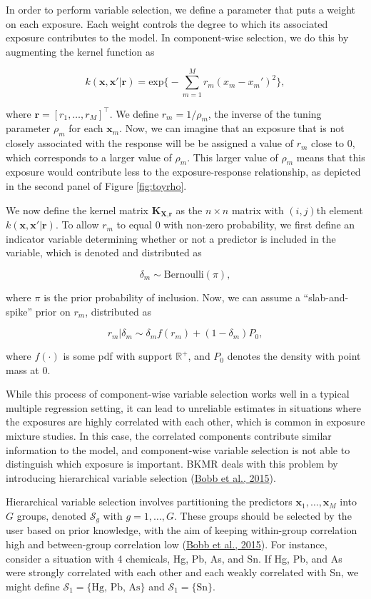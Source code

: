 \documentclass[12pt, twoside]{amherstthesis}
\begin{document}
In order to perform variable selection, we define a parameter that puts a weight on each exposure. Each weight controls the degree to which its associated exposure contributes to the model. In component-wise selection, we do this by augmenting the kernel function as

\[
k(\textbf{x}, \textbf{x}'|\textbf{r}) = \text{exp}\bigg\{ -\sum_{m=1}^Mr_m(x_m-x_m')^2 \bigg\},
\]

\noindent where \(\textbf{r}=[r_1,\dots,r_M]^\top\). We define \(r_m=1/{\rho_m}\), the inverse of the tuning parameter \(\rho_m\) for each \(\textbf{x}_m\). Now, we can imagine that an exposure that is not closely associated with the response will be be assigned a value of \(r_m\) close to 0, which corresponds to a larger value of \(\rho_m\). This larger value of \(\rho_m\) means that this exposure would contribute less to the exposure-response relationship, as depicted in the second panel of Figure \ref{fig:toyrho}.

We now define the kernel matrix \(\textbf{K}_{\textbf{X},\textbf{r}}\) as the \(n\times n\) matrix with \((i,j)\)th element \(k(\textbf{x}, \textbf{x}'|\textbf{r})\). To allow \(r_m\) to equal 0 with non-zero probability, we first define an indicator variable determining whether or not a predictor is included in the variable, which is denoted and distributed as

\[
\delta_m \sim \text{Bernoulli}(\pi),
\]

\noindent where \(\pi\) is the prior probability of inclusion. Now, we can assume a ``slab-and-spike'' prior on \(r_m\), distributed as

\[
r_m|\delta_m \sim \delta_mf(r_m) + (1-\delta_m)P_0, 
\]

\noindent where \(f(\cdot)\) is some pdf with support \(\mathbb{R}^+\), and \(P_0\) denotes the density with point mass at 0.

While this process of component-wise variable selection works well in a typical multiple regression setting, it can lead to unreliable estimates in situations where the exposures are highly correlated with each other, which is common in exposure mixture studies. In this case, the correlated components contribute similar information to the model, and component-wise variable selection is not able to distinguish which exposure is important. BKMR deals with this problem by introducing hierarchical variable selection (\protect\hyperlink{ref-bobb_bayesian_2015}{Bobb et al., 2015}).

Hierarchical variable selection involves partitioning the predictors \(\textbf{x}_1, \dots, \textbf{x}_M\) into \(G\) groups, denoted \(\mathcal{S}_g\) with \(g = 1,\dots,G\). These groups should be selected by the user based on prior knowledge, with the aim of keeping within-group correlation high and between-group correlation low (\protect\hyperlink{ref-bobb_bayesian_2015}{Bobb et al., 2015}). For instance, consider a situation with 4 chemicals, Hg, Pb, As, and Sn. If Hg, Pb, and As were strongly correlated with each other and each weakly correlated with Sn, we might define \(\mathcal{S}_1=\{\textrm{Hg, Pb, As}\}\) and \(\mathcal{S}_1=\{\textrm{Sn}\}\).
\end{document}
